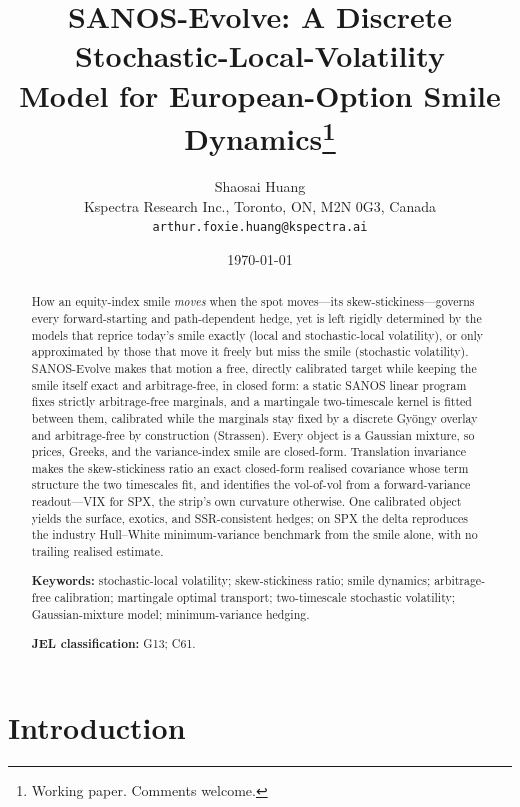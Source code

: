 \documentclass[11pt]{article}
\title{SANOS-Evolve: A Discrete Stochastic-Local-Volatility\\
Model for European-Option Smile Dynamics\thanks{Working paper. Comments welcome.}}
\author{Shaosai Huang\\
{\small Kspectra Research Inc., Toronto, ON, M2N 0G3, Canada}\\
{\small\texttt{arthur.foxie.huang@kspectra.ai}}}
\date{\today}
\begin{document}
\maketitle

\begin{abstract}
How an equity-index smile \emph{moves} when the spot moves---its skew-stickiness---governs every
forward-starting and path-dependent hedge, yet is left rigidly determined by the models that
reprice today's smile exactly (local and stochastic-local volatility), or only approximated by
those that move it freely but miss the smile (stochastic volatility). SANOS-Evolve makes that
motion a free, directly calibrated target while keeping the smile itself exact and arbitrage-free,
in closed form: a static SANOS linear program fixes strictly arbitrage-free marginals, and a
martingale two-timescale kernel is fitted between them, calibrated while the marginals stay fixed
by a discrete Gy\"ongy overlay and arbitrage-free by construction (Strassen). Every object is a
Gaussian mixture, so prices, Greeks, and the variance-index smile are closed-form. Translation
invariance makes the skew-stickiness ratio an exact closed-form realised covariance whose term
structure the two timescales fit, and identifies the vol-of-vol from a forward-variance
readout---VIX for SPX, the strip's own curvature otherwise. One calibrated object yields the
surface, exotics, and SSR-consistent hedges; on SPX the delta reproduces the industry Hull--White
minimum-variance benchmark from the smile alone, with no trailing realised estimate.

\smallskip
\noindent\textbf{Keywords:} stochastic-local volatility; skew-stickiness ratio; smile dynamics;
arbitrage-free calibration; martingale optimal transport; two-timescale stochastic volatility;
Gaussian-mixture model; minimum-variance hedging.

\smallskip
\noindent\textbf{JEL classification:} G13; C61.
\end{abstract}

{\setcounter{tocdepth}{1}\small
\makeatletter\renewcommand*\l@section{\@dottedtocline{1}{0pt}{1.8em}}\makeatother
\tableofcontents}


\section{Introduction}
\label{sec:intro}
\end{document}
